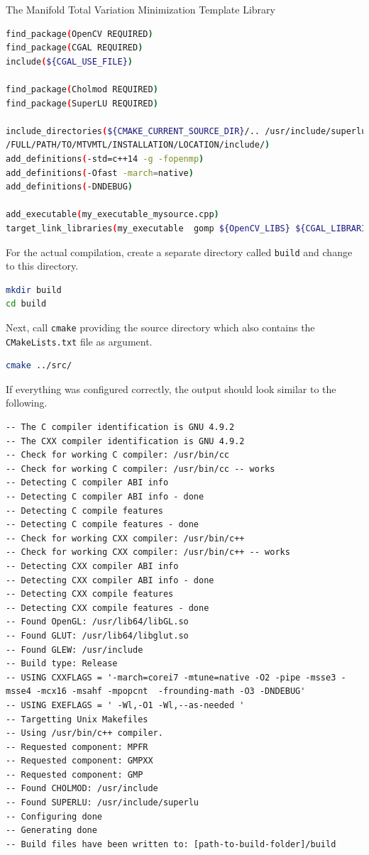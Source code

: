 \begin{chapter}{The Manifold Total Variation Minimization Template Library}
\begin{lstlisting}[language=bash,label=code:cmake_example,caption={Example CMakeLists.txt}]
find_package(OpenCV REQUIRED)
find_package(CGAL REQUIRED)
include(${CGAL_USE_FILE})

find_package(Cholmod REQUIRED)
find_package(SuperLU REQUIRED)

include_directories(${CMAKE_CURRENT_SOURCE_DIR}/.. /usr/include/superlu /usr/include/eigen3 
/FULL/PATH/TO/MTVMTL/INSTALLATION/LOCATION/include/)
add_definitions(-std=c++14 -g -fopenmp)
add_definitions(-Ofast -march=native)
add_definitions(-DNDEBUG)

add_executable(my_executable_mysource.cpp)
target_link_libraries(my_executable  gomp ${OpenCV_LIBS} ${CGAL_LIBRARIES} ${CHOLMOD_LIBRARIES} ${SUPERLU_LIBRARIES} ${OPENGL_LIBRARIES} ${GLUT_LIBRARY} ${GLEW_LIBRARIES})
\end{lstlisting}

For the actual compilation, create a separate directory called \texttt{build} and change to this directory.
\begin{lstlisting}[language=bash]
mkdir build
cd build
\end{lstlisting}

Next, call \texttt{cmake} providing the source directory which also contains the \texttt{CMakeLists.txt} file as argument.
\begin{lstlisting}[language=bash]
cmake ../src/
\end{lstlisting}

If everything was configured correctly, the output should look similar to the following.\\
\begin{lstlisting}
-- The C compiler identification is GNU 4.9.2
-- The CXX compiler identification is GNU 4.9.2
-- Check for working C compiler: /usr/bin/cc
-- Check for working C compiler: /usr/bin/cc -- works
-- Detecting C compiler ABI info
-- Detecting C compiler ABI info - done
-- Detecting C compile features
-- Detecting C compile features - done
-- Check for working CXX compiler: /usr/bin/c++
-- Check for working CXX compiler: /usr/bin/c++ -- works
-- Detecting CXX compiler ABI info
-- Detecting CXX compiler ABI info - done
-- Detecting CXX compile features
-- Detecting CXX compile features - done
-- Found OpenGL: /usr/lib64/libGL.so  
-- Found GLUT: /usr/lib64/libglut.so  
-- Found GLEW: /usr/include  
-- Build type: Release
-- USING CXXFLAGS = '-march=corei7 -mtune=native -O2 -pipe -msse3 -msse4 -mcx16 -msahf -mpopcnt  -frounding-math -O3 -DNDEBUG'
-- USING EXEFLAGS = ' -Wl,-O1 -Wl,--as-needed '
-- Targetting Unix Makefiles
-- Using /usr/bin/c++ compiler.
-- Requested component: MPFR
-- Requested component: GMPXX
-- Requested component: GMP
-- Found CHOLMOD: /usr/include  
-- Found SUPERLU: /usr/include/superlu  
-- Configuring done
-- Generating done
-- Build files have been written to: [path-to-build-folder]/build
\end{lstlisting}


\end{chapter}
